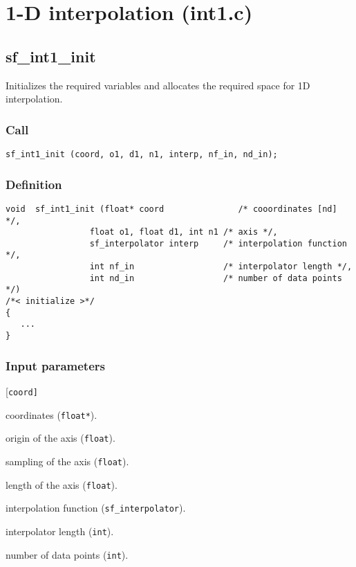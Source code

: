 \section{1-D interpolation (int1.c)}




\subsection{{sf\_int1\_init}}\label{sec:sf_int1_init}
Initializes the required variables and allocates the required space for 1D interpolation.

\subsubsection*{Call}
\begin{verbatim}sf_int1_init (coord, o1, d1, n1, interp, nf_in, nd_in);\end{verbatim}

\subsubsection*{Definition}
\begin{verbatim}
void  sf_int1_init (float* coord               /* cooordinates [nd] */, 
                 float o1, float d1, int n1 /* axis */, 
                 sf_interpolator interp     /* interpolation function */, 
                 int nf_in                  /* interpolator length */, 
                 int nd_in                  /* number of data points */)
/*< initialize >*/
{
   ...
}
\end{verbatim}

\subsubsection*{Input parameters}
\begin{desclist}{\tt }{\quad}[\tt coord]
   \setlength\itemsep{0pt}
   \item[coord]  coordinates (\texttt{float*}).  
   \item[o1]     origin of the axis (\texttt{float}).  
   \item[d1]     sampling of the axis (\texttt{float}).  
   \item[n1]     length of the axis (\texttt{float}).  
   \item[interp] interpolation function (\texttt{sf\_interpolator}).  
   \item[nf\_in] interpolator length (\texttt{int}).  
   \item[nd\_in] number of data points (\texttt{int}).  
\end{desclist}




